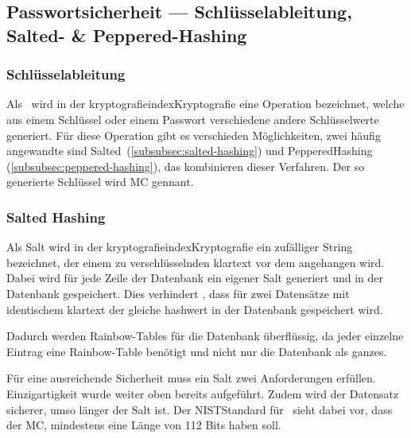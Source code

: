 \subsection[Passwortsicherheit]{Passwortsicherheit — Schlüsselableitung, Salted- \& Peppered-Hashing}\label{subsec:passwortsicherheit}

\subsubsection{Schlüsselableitung}\label{subsubsec:key-derivation-function}
Als~ wird in der \gls{kryptografie}index{Kryptografie} eine Operation bezeichnet, welche aus einem Schlüssel oder einem Passwort verschiedene andere Schlüsselwerte generiert.\autocite[\vglf][]{NIST:800132}
Für diese Operation gibt es verschieden Möglichkeiten, zwei häufig angewandte sind Salted\nonbreakdash\ (\autoref{subsubsec:salted-hashing}) und Peppered\nonbreakdash Hashing (\autoref{subsubsec:peppered-hashing}), \bzw das kombinieren dieser Verfahren.
Der so generierte Schlüssel wird \ac{MC} gennant.

\subsubsection{Salted Hashing}\label{subsubsec:salted-hashing}
Als Salt wird in der \gls{kryptografie}index{Kryptografie} ein zufälliger String bezeichnet, der einem zu verschlüsselnden \gls{klartext} vor dem  angehangen wird\autocite[\vglf][]{JoyOfCryptography:2021}.
Dabei wird für jede Zeile der Datenbank ein eigener Salt generiert und in der Datenbank gespeichert.
Dies verhindert \uaol, dass für zwei Datensätze mit identischem \gls{klartext} der gleiche \gls{hashwert} in der Datenbank gespeichert wird.

Dadurch werden \glspl{Rainbow-Table} für die Datenbank überflüssig, da jeder einzelne Eintrag eine \gls{Rainbow-Table} benötigt und nicht nur die Datenbank als ganzes.~\autocite[\vglf][]{JoyOfCryptography:2021}

Für eine ausreichende Sicherheit muss ein Salt zwei Anforderungen erfüllen.
Einzigartigkeit wurde weiter oben bereits aufgeführt.
Zudem wird der Datensatz sicherer, umso länger der Salt ist.
Der \ac{NIST}\nonbreakdash Standard für\  sieht dabei vor, dass der \ac{MC}, mindestens eine Länge von 112 Bits haben soll.\autocite[\vglf][]{NIST:800132}

